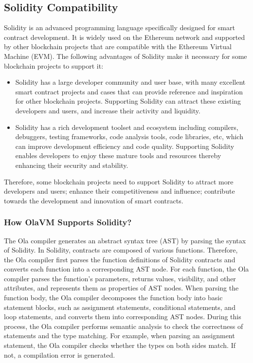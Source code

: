 \subsection{Solidity Compatibility}\label{section: solidity-compatibility}

Solidity is an advanced programming language specifically designed for smart contract development. It is widely used on the Ethereum network and supported by other blockchain projects that are compatible with the Ethereum Virtual Machine (EVM). The following advantages of Solidity make it necessary for some blockchain projects to support it:

\begin{itemize}
    \item Solidity has a large developer community and user base, with many excellent smart contract projects and cases that can provide reference and inspiration for other blockchain projects. Supporting Solidity can attract these existing developers and users, and increase their activity and liquidity.
    \item Solidity has a rich development toolset and ecosystem including compilers, debuggers, testing frameworks, code analysis tools, code libraries, etc, which can improve development efficiency and code quality. Supporting Solidity enables developers to enjoy these mature tools and resources thereby enhancing their security and stability.
\end{itemize}

Therefore, some blockchain projects need to support Solidity to attract more developers and users; enhance their competitiveness and influence; contribute towards the development and innovation of smart contracts.


\subsubsection{How OlaVM Supports Solidity?}

The Ola compiler generates an abstract syntax tree (AST) by parsing the syntax of Solidity. In Solidity, contracts are composed of various functions. Therefore, the Ola compiler first parses the function definitions of Solidity contracts and converts each function into a corresponding AST node. For each function, the Ola compiler parses the function's parameters, returns values, visibility, and other attributes, and represents them as properties of AST nodes. When parsing the function body, the Ola compiler decomposes the function body into basic statement blocks, such as assignment statements, conditional statements, and loop statements, and converts them into corresponding AST nodes. During this process, the Ola compiler performs semantic analysis to check the correctness of statements and the type matching. For example, when parsing an assignment statement, the Ola compiler checks whether the types on both sides match. If not, a compilation error is generated.

